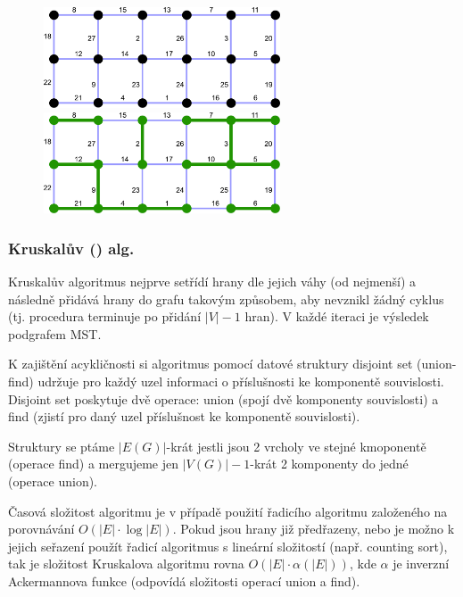 \begin{figure}[h]
    \begin{center}
        \includegraphics[width=70mm]{02/images/boruvka01}
        \hspace{10px}
        \includegraphics[width=70mm]{02/images/boruvka02}
    \end{center}
\end{figure}

\subsubsection{Kruskalův () alg.}

Kruskalův algoritmus nejprve setřídí hrany dle jejich váhy (od nejmenší) a následně přidává hrany do grafu takovým způsobem, aby nevznikl žádný cyklus (tj. procedura terminuje po přidání $\vert V \vert -1$ hran). V každé iteraci je výsledek podgrafem MST.

K zajištění acykličnosti si algoritmus pomocí datové struktury disjoint set (union-find) udržuje pro každý uzel informaci o příslušnosti ke komponentě souvislosti. Disjoint set poskytuje dvě operace: union (spojí dvě komponenty souvislosti) a find (zjistí pro daný uzel příslušnost ke komponentě souvislosti).

Struktury se ptáme $\vert E(G)\vert$-krát jestli jsou 2 vrcholy ve stejné kmoponentě (operace find) a mergujeme jen $\vert V(G)\vert -1$-krát 2 komponenty do jedné (operace union).

Časová složitost algoritmu je v případě použití řadicího algoritmu založeného na porovnávání $O(\vert E\vert \cdot \log \vert E \vert)$. Pokud jsou hrany již předřazeny, nebo je možno k jejich seřazení použít řadicí algoritmus s lineární složitostí (např. counting sort), tak je složitost Kruskalova algoritmu rovna $O(\vert E\vert \cdot \alpha(\vert E \vert))$, kde $\alpha$ je inverzní Ackermannova funkce (odpovídá složitosti operací union a find).


